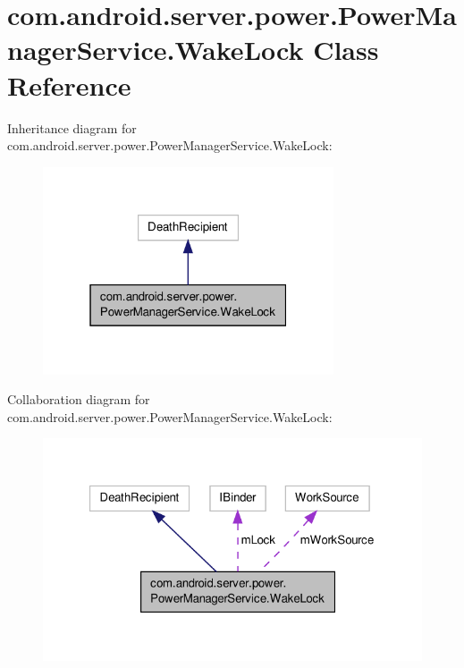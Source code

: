 \hypertarget{classcom_1_1android_1_1server_1_1power_1_1PowerManagerService_1_1WakeLock}{\section{com.\-android.\-server.\-power.\-Power\-Manager\-Service.\-Wake\-Lock Class Reference}
\label{classcom_1_1android_1_1server_1_1power_1_1PowerManagerService_1_1WakeLock}
}


Inheritance diagram for com.\-android.\-server.\-power.\-Power\-Manager\-Service.\-Wake\-Lock\-:
\nopagebreak
\begin{figure}[H]
\begin{center}
\leavevmode
\includegraphics[width=244pt]{classcom_1_1android_1_1server_1_1power_1_1PowerManagerService_1_1WakeLock__inherit__graph}
\end{center}
\end{figure}


Collaboration diagram for com.\-android.\-server.\-power.\-Power\-Manager\-Service.\-Wake\-Lock\-:
\nopagebreak
\begin{figure}[H]
\begin{center}
\leavevmode
\includegraphics[width=321pt]{classcom_1_1android_1_1server_1_1power_1_1PowerManagerService_1_1WakeLock__coll__graph}
\end{center}
\end{figure}
